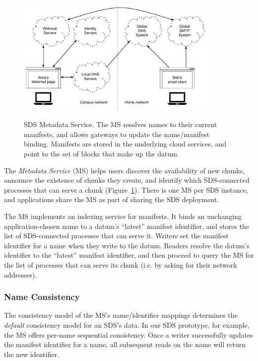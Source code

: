 \begin{figure}[h]
   \caption{SDS Metadata Service.  The MS resolves names to their current
   manifests, and allows gateways to update the name/manifest binding.
   Manifests are stored in the underlying cloud services, and
   point to the set of blocks that make up the datum.}
   \centering
   \includegraphics[width=0.9\textwidth,page=5]{figures/dissertation-figures}
   \label{fig:chap2-metadata-service}
\end{figure}

The \emph{Metadata Service} (MS) helps users discover the
availability of new chunks, announce the existence of chunks they create, and
identify which SDS-connected processes that can serve a chunk
(Figure~\ref{fig:chap2-metadata-service}).
There is one MS per SDS instance, and
applications share the MS as part of sharing the SDS deployment.

The MS implements an indexing service for manifests.  It binds an unchanging
application-chosen name to a datum's ``latest'' manifest
identifier, and stores the list of SDS-connected processes that can serve it.
Writers set the manifest identifier for a name when they write to the datum.
Readers resolve the datum's identifier to the ``latest'' manifest identifier,
and then proceed to query the MS for the list of processes that can serve its
chunk (i.e. by asking for their network addresses).

\subsubsection{Name Consistency}

The consistency model of the MS's name/identifier mappings determines the \emph{default}
consistency model for an SDS's data.
In our SDS prototype, for example, the MS offers
per-name sequential consistency.  Once a writer successfully updates the manifest
identifier for a name, all subsequent reads on the name will return the new
identifier.

